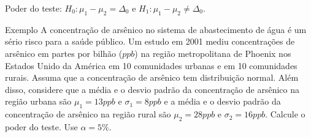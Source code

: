 \documentclass[9pt]{beamer}
\begin{document}
\begin{frame}{Poder do teste: $H_0:\mu_1 - \mu_2 = \Delta_0$ e $H_1: \mu_1 - \mu_2 \neq \Delta_0$.}

\begin{block}{Exemplo}
	A concentração de arsênico no sistema de abastecimento de água é um sério risco para a saúde público. Um estudo em 2001 	mediu concentrações de arsênico em partes por bilhão ($ppb$) na região metropolitana de Phoenix nos Estados Unido da América em 10 comunidades urbanas e em 10 comunidades rurais. Assuma que a concentração de arsênico tem distribuição normal. Além disso, considere que a média e o desvio padrão da concentração de arsênico na região urbana são $\mu_1 = 13 ppb$ e $\sigma_1=8 ppb$ e a média e o desvio padrão da concentração de arsênico na região rural são $\mu_2=28 ppb$ e $\sigma_2=16 ppb$. Calcule o poder do teste. Use $\alpha=5\%$.	
\end{block}

\end{frame}
\end{document}

